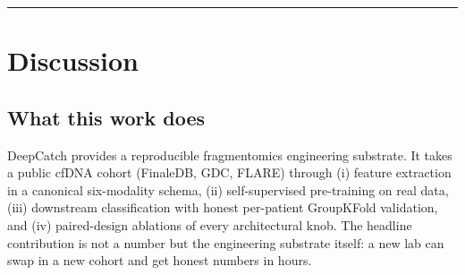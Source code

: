 \documentclass[11pt]{article}
\begin{document}
\par\bigskip\hrule\bigskip
\section{Discussion}
\subsection{What this work does}
DeepCatch provides a reproducible fragmentomics engineering substrate. It takes a public cfDNA cohort (FinaleDB, GDC, FLARE) through (i) feature extraction in a canonical six-modality schema, (ii) self-supervised pre-training on real data, (iii) downstream classification with honest per-patient GroupKFold validation, and (iv) paired-design ablations of every architectural knob. The headline contribution is not a number but the engineering substrate itself: a new lab can swap in a new cohort and get honest numbers in hours.
\end{document}
